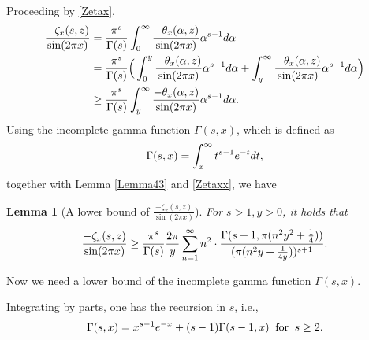 \documentclass[reqno,english]{amsart}
\newtheorem{lemma}{Lemma}[section]
\newtheorem{open problem}{Open Problem}[section]
\newtheorem{open question}{Open Question}[section]
\newtheorem{open questions on hexagonal lattice}{Open Questions on hexagonal lattice}[section]
\begin{document}
Proceeding by \eqref{Zetax},
 \begin{equation}\aligned\label{Zetaxx}
\frac{-\zeta_x(s,z)}{\sin(2\pi x)}&=\frac{\pi^s}{\Gamma(s)}\int_0^\infty \frac{-\theta_x(\alpha,z)}{\sin(2\pi x)}\alpha^{s-1}d\alpha\\
&=\frac{\pi^s}{\Gamma(s)}\Big(\int_0^y \frac{-\theta_x(\alpha,z)}{\sin(2\pi x)}\alpha^{s-1}d\alpha
+\int_y^\infty \frac{-\theta_x(\alpha,z)}{\sin(2\pi x)}\alpha^{s-1}d\alpha\Big)\\
&\geq\frac{\pi^s}{\Gamma(s)}\int_y^\infty \frac{-\theta_x(\alpha,z)}{\sin(2\pi x)}\alpha^{s-1}d\alpha.
\endaligned\end{equation}
Using the incomplete gamma function $\Gamma(s,x)$, which is defined as
 \begin{equation}\aligned\nonumber
\Gamma(s,x)=\int_{x}^\infty t^{s-1}e^{-t}dt,
\endaligned\end{equation}
together with Lemma \ref{Lemma43} and \eqref{Zetaxx}, we have
\begin{lemma}[A lower bound of $\frac{-\zeta_x(s,z)}{\sin(2\pi x)}$]\label{Lemma4.6}
For $s>1, y>0$, it holds that
 \begin{equation}\aligned\nonumber
\frac{-\zeta_x(s,z)}{\sin(2\pi x)}\geq\frac{\pi^s}{\Gamma(s)}\frac{2\pi}{y}
\sum_{n=1}^\infty  n^2\cdot\frac{\Gamma(s+1,\pi (n^2y^2+\frac{1}{4}))}{(\pi (n^2 y+\frac{1}{4y}))^{s+1}}.
\endaligned\end{equation}

\end{lemma}

Now we need a lower bound of the incomplete gamma function $\Gamma(s,x)$.

Integrating by parts, one has the recursion in $s$, i.e.,
 \begin{equation}\aligned\label{Rec}
\Gamma(s,x)=x^{s-1}e^{-x}+(s-1)\Gamma(s-1,x)\;\;\hbox{for}\;\;s\geq2.
\endaligned\end{equation}
\end{document}
